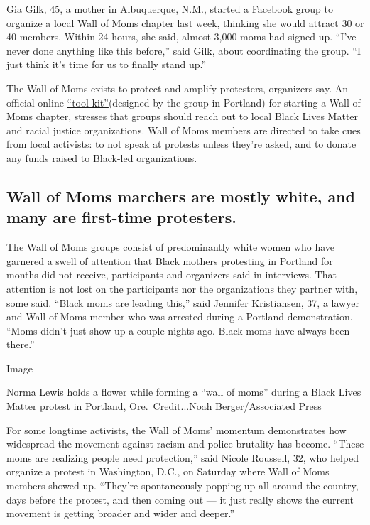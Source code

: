 Gia Gilk, 45, a mother in Albuquerque, N.M., started a Facebook group to
organize a local Wall of Moms chapter last week, thinking she would
attract 30 or 40 members. Within 24 hours, she said, almost 3,000 moms
had signed up. ``I've never done anything like this before,'' said Gilk,
about coordinating the group. ``I just think it's time for us to finally
stand up.''

The Wall of Moms exists to protect and amplify protesters, organizers
say. An official online
\href{https://thewallofmoms.com/wall-of-mom-chapters}{``tool
kit''}(designed by the group in Portland) for starting a Wall of Moms
chapter, stresses that groups should reach out to local Black Lives
Matter and racial justice organizations. Wall of Moms members are
directed to take cues from local activists: to not speak at protests
unless they're asked, and to donate any funds raised to Black-led
organizations.

\hypertarget{wall-of-moms-marchers-are-mostly-white-and-many-are-first-time-protesters}{%
\subsection{Wall of Moms marchers are mostly white, and many are
first-time
protesters.}\label{wall-of-moms-marchers-are-mostly-white-and-many-are-first-time-protesters}}

The Wall of Moms groups consist of predominantly white women who have
garnered a swell of attention that Black mothers protesting in Portland
for months did not receive, participants and organizers said in
interviews. That attention is not lost on the participants nor the
organizations they partner with, some said. ``Black moms are leading
this,'' said Jennifer Kristiansen, 37, a lawyer and Wall of Moms member
who was arrested during a Portland demonstration. ``Moms didn't just
show up a couple nights ago. Black moms have always been there.''

Image

Norma Lewis holds a flower while forming a ``wall of moms'' during a
Black Lives Matter protest in Portland, Ore.~Credit...Noah
Berger/Associated Press

For some longtime activists, the Wall of Moms' momentum demonstrates how
widespread the movement against racism and police brutality has become.
``These moms are realizing people need protection,'' said Nicole
Roussell, 32, who helped organize a protest in Washington, D.C., on
Saturday where Wall of Moms members showed up. ``They're spontaneously
popping up all around the country, days before the protest, and then
coming out --- it just really shows the current movement is getting
broader and wider and deeper.''

